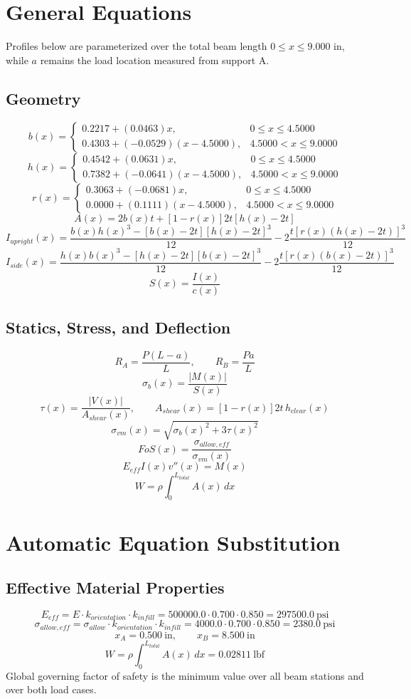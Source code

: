 \documentclass[11pt]{article}
\begin{document}
\section*{General Equations}
Profiles below are parameterized over the total beam length $0 \le x \le 9.000$ in, while $a$ remains the load location measured from support A.
\subsection*{Geometry}
\[
b(x)=\begin{cases}0.2217 + (0.0463)x, & 0 \le x \le 4.5000\\0.4303 + (-0.0529)(x-4.5000), & 4.5000 < x \le 9.0000\end{cases}
\]
\[
h(x)=\begin{cases}0.4542 + (0.0631)x, & 0 \le x \le 4.5000\\0.7382 + (-0.0641)(x-4.5000), & 4.5000 < x \le 9.0000\end{cases}
\]
\[
r(x)=\begin{cases}0.3063 + (-0.0681)x, & 0 \le x \le 4.5000\\0.0000 + (0.1111)(x-4.5000), & 4.5000 < x \le 9.0000\end{cases}
\]
\[
A(x)=2b(x)t+[1-r(x)]2t[h(x)-2t]
\]
\[
I_{upright}(x)=\frac{b(x)h(x)^3-[b(x)-2t][h(x)-2t]^3}{12}-2\frac{t[r(x)(h(x)-2t)]^3}{12}
\]
\[
I_{side}(x)=\frac{h(x)b(x)^3-[h(x)-2t][b(x)-2t]^3}{12}-2\frac{t[r(x)(b(x)-2t)]^3}{12}
\]
\[
S(x)=\frac{I(x)}{c(x)}
\]

\subsection*{Statics, Stress, and Deflection}
\[
R_A=\frac{P(L-a)}{L}, \qquad R_B=\frac{Pa}{L}
\]
\[
\sigma_b(x)=\frac{|M(x)|}{S(x)}
\]
\[
\tau(x)=\frac{|V(x)|}{A_{shear}(x)}, \qquad A_{shear}(x)=[1-r(x)]2t\,h_{clear}(x)
\]
\[
\sigma_{vm}(x)=\sqrt{\sigma_b(x)^2+3\tau(x)^2}
\]
\[
FoS(x)=\frac{\sigma_{allow,eff}}{\sigma_{vm}(x)}
\]
\[
E_{eff}I(x)v''(x)=M(x)
\]
\[
W=\rho\int_0^{L_{total}} A(x)\,dx
\]

\section*{Automatic Equation Substitution}
\subsection*{Effective Material Properties}
\[E_{eff} = E \cdot k_{orientation} \cdot k_{infill} = 500000.0 \cdot 0.700 \cdot 0.850 = 297500.0\ \mathrm{psi}\]
\[\sigma_{allow,eff} = \sigma_{allow} \cdot k_{orientation} \cdot k_{infill} = 4000.0 \cdot 0.700 \cdot 0.850 = 2380.0\ \mathrm{psi}\]
\[x_A = 0.500\ \mathrm{in}, \qquad x_B = 8.500\ \mathrm{in}\]
\[W = \rho \int_0^{L_{total}} A(x)\,dx = 0.02811\ \mathrm{lbf}\]
Global governing factor of safety is the minimum value over all beam stations and over both load cases.
\end{document}
